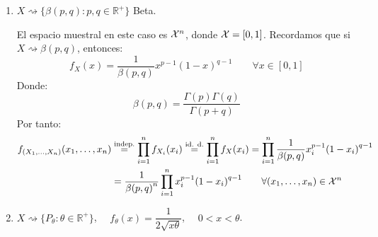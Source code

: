 \begin{ejercicio}
\begin{enumerate}[label=\alph*)]
            El espacio muestral en este caso es $\cc{X}^n$, donde  $\cc{X}=\mathbb{R}^+_0$. Recordamos que si $X\rightsquigarrow \Gamma(p,a)$, entonces:
            \begin{equation*}
                f_X(x) = \dfrac{a^p}{\Gamma(p)} x^{p-1} e^{-ax} \qquad \forall x\in \mathbb{R}^+_0
            \end{equation*}
            Por lo que:
            \begin{align*}
                f_{(X_1, \ldots, X_n)}(x_1, \ldots, x_n) &\stackrel{\text{indep.}}{=} \prod_{i=1}^{n} f_{X_i}(x_i) \stackrel{\text{id. d.}}{=} \prod_{i=1}^{n} f_X(x_i) 
                = \prod_{i=1}^{n} \dfrac{a^p}{\Gamma(p)} x_i^{p-1} e^{-ax_i} \\
                                                         &= {\left(\dfrac{a^p}{\Gamma(p)}\right)}^{n} \cdot e^{-a\sum\limits_{i=1}^n x_i} \cdot \prod_{i=1}^{n} x_i^{p-1} \qquad \forall (x_1,\ldots,x_n)\in \cc{X}^n
            \end{align*}
        \item $X\rightsquigarrow\{\beta(p,q) : p,q\in \mathbb{R}^+\}$ Beta.

            El espacio muestral en este caso es $\cc{X}^n$, donde $\mathcal{X} = [0,1]$. Recordamos que si $X\rightsquigarrow \beta(p,q)$, entonces:
            \begin{equation*}
                f_X(x) = \dfrac{1}{\beta(p,q)} x^{p-1} {(1-x)}^{q-1} \qquad \forall x\in [0,1]
            \end{equation*}
            Donde:
            \begin{equation*}
                \beta(p,q) = \dfrac{\Gamma(p)\Gamma(q)}{\Gamma(p+q)}
            \end{equation*}
            Por tanto:
            \begin{align*}
                f_{(X_1, \ldots, X_n)}(x_1, \ldots, x_n) &\stackrel{\text{indep.}}{=} \prod_{i=1}^{n} f_{X_i}(x_i) \stackrel{\text{id. d.}}{=} \prod_{i=1}^{n} f_X(x_i) 
                = \prod_{i=1}^{n} \dfrac{1}{\beta(p,q)} x_i^{p-1} {(1-x_i)}^{q-1} \\
                                                         &= \dfrac{1}{{\beta(p,q)}^{n}} \prod_{i=1}^{n}x_i^{p-1} {(1-x_i)}^{q-1} \qquad \forall (x_1,\ldots,x_n) \in \mathcal{X}^n
            \end{align*}
        \item $X\rightsquigarrow\{P_\theta : \theta \in \mathbb{R}^+\}$, $\quad f_\theta(x) = \dfrac{1}{2\sqrt{x\theta}}$, $\quad 0<x<\theta$.
        

\end{enumerate}
\end{ejercicio}
